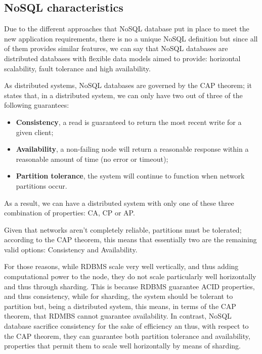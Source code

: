 \subsection{NoSQL characteristics}
Due to the different approaches that NoSQL database put in place to meet the new application requirements, there is no a unique NoSQL definition but since all of them provides similar features, we can say that NoSQL databases are distributed databases with flexible data models aimed to provide: horizontal scalability, fault tolerance and high availability.

\noindent As distributed systems, NoSQL databases are governed by the CAP theorem; it states that, in a distributed system, we can only have two out of three of the following guarantees:
\begin{itemize}
\item \textbf{Consistency}, a read is guaranteed to return the most recent write for a given client;
\item \textbf{Availability}, a non-failing node will return a reasonable response within a reasonable amount of time (no error or timeout);
\item \textbf{Partition tolerance}, the system will continue to function when network partitions occur.
\end{itemize}

\noindent As a result, we can have a distributed system with only one of these three combination of properties: CA, CP or AP.

\noindent Given that networks aren't completely reliable, partitions must be tolerated; according to the CAP theorem, this means that essentially two are the remaining valid options: Consistency and Availability.

\noindent For those reasons, while RDBMS scale very well vertically, and thus adding computational power to the node, they do not scale particularly well horizontally and thus through sharding. This is because RDBMS guarantee ACID properties, and thus consistency, while for sharding, the system should be tolerant to partition but, being a distributed system, this means, in terms of the CAP theorem, that RDMBS cannot guarantee availability. In contrast, NoSQL database sacrifice consistency for the sake of efficiency an thus, with respect to the CAP theorem, they can guarantee both partition tolerance and availability, properties that permit them to scale well horizontally by means of sharding.

